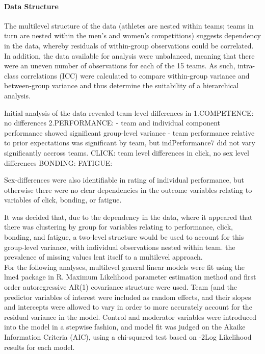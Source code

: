 \documentclass[12pt]{report}
\begin{document}
\paragraph{Data Structure}
The multilevel structure of the data (athletes are nested within teams; teams in turn are nested within the men's and women's competitions) suggests dependency in the data, whereby residuals of within-group observations could be correlated.  In addition, the data available for analysis were unbalanced, meaning that there were an uneven number of observations for each of the 15 teams.  As such,  intra-class correlations (ICC) were calculated to compare within-group variance and between-group variance and thus determine the suitability of a hierarchical analysis.

Initial analysis of the data revealed team-level differences in
1.COMPETENCE: no differences
2.PERFORMANCE:
- team and individual component performance showed significant group-level variance
- team performance relative to prior expectations was significant by team, but indPerformance7 did not vary significantly accross teams.
CLICK:
team level differences in click, no sex level differences
BONDING:
FATIGUE:

Sex-differences were also identifiable in rating of individual performance, but otherwise there were no clear dependencies in the outcome variables relating to variables of click, bonding, or fatigue.

It was decided that, due to the dependency in the data, where it appeared that there was clustering by group for variables relating to performance, click, bonding, and fatigue, a two-level structure would be used to account for this group-level variance, with  individual observations nested within team.
the prevalence of missing values lent itself to a multilevel approach.\\

For the following analyses,  multilevel general linear models were fit using the lme4 package in R.  Maximum Likelihood parameter estimation method and first order autoregressive AR(1) covariance structure were used. Team (and the predictor variables of interest were included as random effects, and their slopes and intercepts were allowed to vary in order to  more accurately account for the residual variance in the model. Control and moderator variables were introduced into the model in a stepwise fashion, and model fit was judged on the Akaike Information Criteria (AIC), using a chi-squared test based on -2Log Likelihood results for each model.
\end{document}
